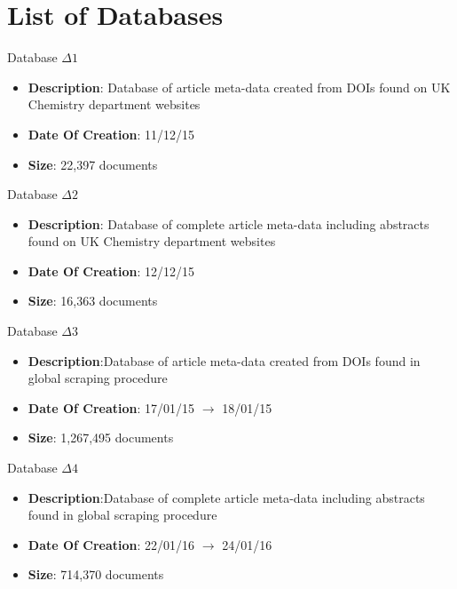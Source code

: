 \chapter*{List of Databases}
\begin{Large}\begin{textbf}{Database $\Delta 1$} \end{textbf}\end{Large}
	\begin{itemize}
	\itemsep-0.5em
	\item \textbf{Description}: Database of article meta-data created from DOIs found on UK Chemistry department websites
	\item \textbf{Date Of Creation}: 11/12/15
	\item \textbf{Size}: 22,397 documents
	\end{itemize}
\begin{Large}\begin{textbf}{Database $\Delta 2$} \end{textbf}\end{Large}
	\begin{itemize}
	\item \textbf{Description}: Database of complete article meta-data including abstracts found on UK Chemistry department websites
	\item \textbf{Date Of Creation}: 12/12/15
	\item \textbf{Size}: 16,363 documents
	\end{itemize}
\begin{Large}\begin{textbf}{Database $\Delta 3$} \end{textbf}\end{Large}
	\begin{itemize}
	\item \textbf{Description}:Database of article meta-data created from DOIs found in global scraping procedure
	\item \textbf{Date Of Creation}: 17/01/15 $\rightarrow$ 18/01/15
	\item \textbf{Size}: 1,267,495 documents
	\end{itemize}
\begin{Large}\begin{textbf}{Database $\Delta 4$} \end{textbf}\end{Large}
	\begin{itemize}
	\item \textbf{Description}:Database of complete article meta-data including abstracts found in global scraping procedure
	\item \textbf{Date Of Creation}: 22/01/16 $\rightarrow$ 24/01/16
	\item \textbf{Size}: 714,370 documents
	\end{itemize}
